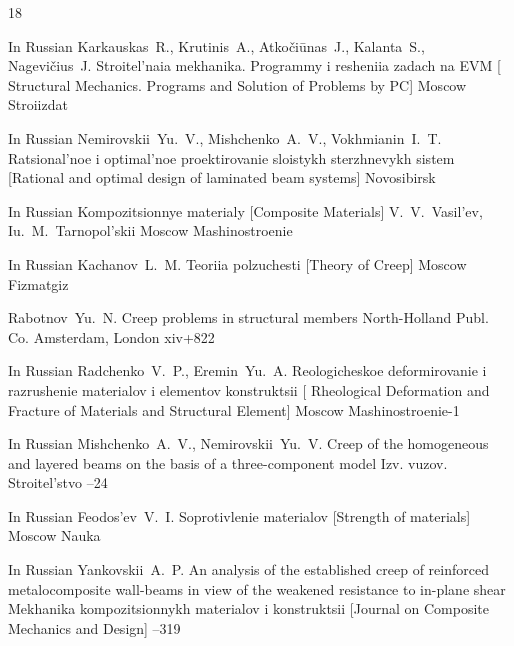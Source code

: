 \begin{thebibliography}{18}


\lang In Russian
\by Karkauskas~R., Krutinis~A., Atko\v{c}i\={u}nas~J.,  Kalanta~S., Nagevi\v{c}ius~J.
\book Stroitel'naia mekhanika. Programmy i resheniia zadach na EVM
\rm [ Structural Mechanics. Programs and Solution of Problems by PC]
\publaddr Moscow
\publ Stroiizdat

\lang In Russian
\by Nemirovskii~Yu.~V., Mishchenko~A.~V., Vokhmianin~I.~T.
\book Ratsional'noe i optimal'noe proektirovanie sloistykh sterzhnevykh sistem \rm [Rational and optimal design of laminated beam systems]
\publaddr Novosibirsk


\lang In Russian
\book Kompozitsionnye materialy \rm [Composite Materials]
\ed V.~V.~Vasil'ev, Iu.~M.~Tarnopol'skii
\publaddr Moscow
\publ Mashinostroenie


\lang In Russian
\by Kachanov~L.~M.
\book Teoriia polzuchesti \rm [Theory of Creep]
\publaddr Moscow
\publ Fizmatgiz


\by  Rabotnov~Yu.~N.
\book Creep problems in structural members
\publ North-Holland Publ. Co.
\publaddr Amsterdam, London
\totalpages xiv+822 


\lang In Russian
\by Radchenko~V.~P., Eremin~Yu.~A.
\book Reologicheskoe deformirovanie i razrushenie materialov i elementov konstruktsii \rm [ Rheological Deformation and Fracture of Materials and Structural Element]
\publaddr Moscow
\publ Mashinostroenie-1


\lang In Russian
\by  Mishchenko~A.~V., Nemirovskii~Yu.~V.
\paper Creep of the homogeneous and layered beams on the basis of a three-component model
\jour Izv. vuzov. Stroitel'stvo
--24

\lang In Russian
\by Feodos'ev~V.~I.
\book Soprotivlenie materialov \rm [Strength of materials]
\publaddr Moscow
\publ Nauka



\lang In Russian
\by Yankovskii~A.~P.
\paper An analysis of the established creep of reinforced metalocomposite wall-beams in view of the weakened resistance to in-plane shear
\jour Mekhanika kompozitsionnykh materialov i konstruktsii \rm [Journal on Composite Mechanics and Design]
--319


\end{thebibliography}
